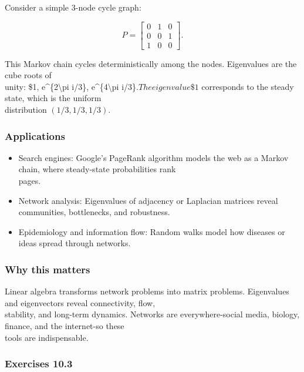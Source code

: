 \documentclass[
  12pt,
  a4paper,
]{article}
\begin{document}
Consider a simple 3-node cycle graph:

\[P = \begin{bmatrix}
0 & 1 & 0 \\
0 & 0 & 1 \\
1 & 0 & 0
\end{bmatrix}.\]

This Markov chain cycles deterministically among the nodes. Eigenvalues
are the cube roots of\\
unity: \$1, e\^{}\{2\textbackslash pi i/3\}, e\^{}\{4\textbackslash pi
i/3\}\(. The eigenvalue \$1\) corresponds to the steady state, which is
the uniform\\
distribution \((1/3,1/3,1/3)\).

\subsubsection{Applications}\label{applications-3}

\begin{itemize}
\item
  Search engines: Google's PageRank algorithm models the web as a Markov
  chain, where steady-state probabilities rank\\
  pages.
\item
  Network analysis: Eigenvalues of adjacency or Laplacian matrices
  reveal communities, bottlenecks, and robustness.
\item
  Epidemiology and information flow: Random walks model how diseases or
  ideas spread through networks.
\end{itemize}

\subsubsection{Why this matters}\label{why-this-matters-38}

Linear algebra transforms network problems into matrix problems.
Eigenvalues and eigenvectors reveal connectivity, flow,\\
stability, and long-term dynamics. Networks are everywhere-social media,
biology, finance, and the internet-so these\\
tools are indispensable.

\subsubsection{Exercises 10.3}\label{exercises-103}
\end{document}
